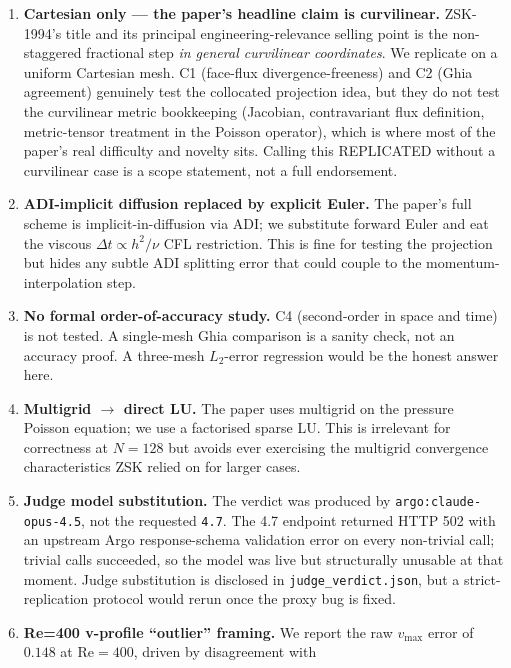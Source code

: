 \documentclass[11pt]{article}
\begin{document}
\begin{enumerate}
\item \textbf{Cartesian only --- the paper's headline claim is curvilinear.}
      ZSK-1994's title and its principal engineering-relevance selling point
      is the non-staggered fractional step \emph{in general curvilinear
      coordinates}. We replicate on a uniform Cartesian mesh. C1 (face-flux
      divergence-freeness) and C2 (Ghia agreement) genuinely test the
      collocated projection idea, but they do not test the curvilinear
      metric bookkeeping (Jacobian, contravariant flux definition,
      metric-tensor treatment in the Poisson operator), which is where most
      of the paper's real difficulty and novelty sits. Calling this
      \textsc{REPLICATED} without a curvilinear case is a scope statement,
      not a full endorsement.
\item \textbf{ADI-implicit diffusion replaced by explicit Euler.} The paper's
      full scheme is implicit-in-diffusion via ADI; we substitute forward
      Euler and eat the viscous $\Delta t\propto h^2/\nu$ CFL restriction.
      This is fine for testing the projection but hides any subtle ADI
      splitting error that could couple to the momentum-interpolation step.
\item \textbf{No formal order-of-accuracy study.} C4 (second-order in space
      and time) is not tested. A single-mesh Ghia comparison is a sanity
      check, not an accuracy proof. A three-mesh $L_2$-error regression
      would be the honest answer here.
\item \textbf{Multigrid $\to$ direct LU.} The paper uses multigrid on the
      pressure Poisson equation; we use a factorised sparse LU. This is
      irrelevant for correctness at $N=128$ but avoids ever exercising the
      multigrid convergence characteristics ZSK relied on for larger cases.
\item \textbf{Judge model substitution.} The verdict was produced by
      \texttt{argo:claude-opus-4.5}, not the requested \texttt{4.7}. The 4.7
      endpoint returned HTTP 502 with an upstream Argo response-schema
      validation error on every non-trivial call; trivial calls succeeded,
      so the model was live but structurally unusable at that moment. Judge
      substitution is disclosed in \texttt{judge\_verdict.json}, but a
      strict-replication protocol would rerun once the proxy bug is fixed.
\item \textbf{Re=400 v-profile ``outlier'' framing.} We report the raw
      $v_{\max}$ error of $0.148$ at Re$=400$, driven by disagreement with

\end{enumerate}
\end{document}
